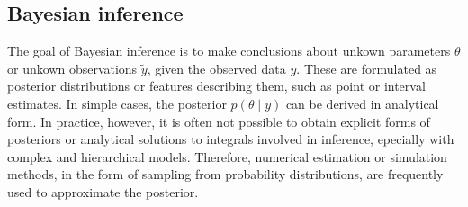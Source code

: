 




\subsection{Bayesian inference}\label{sec:bayesian-inference}

The goal of Bayesian inference is to make conclusions about unkown parameters
$\theta$ or unkown observations $\tilde{y}$, given the observed data $y$.
These are formulated as posterior distributions or features describing them,
such as point or interval estimates. In simple cases, the posterior $p(\theta \mid y)$
can be derived in analytical form. In practice, however, it is often not possible to obtain
explicit forms of posteriors or analytical solutions to integrals involved in
inference, epecially with complex and hierarchical models. Therefore,
numerical estimation or simulation methods, in the form of sampling from
probability distributions, are frequently used to approximate the posterior.



